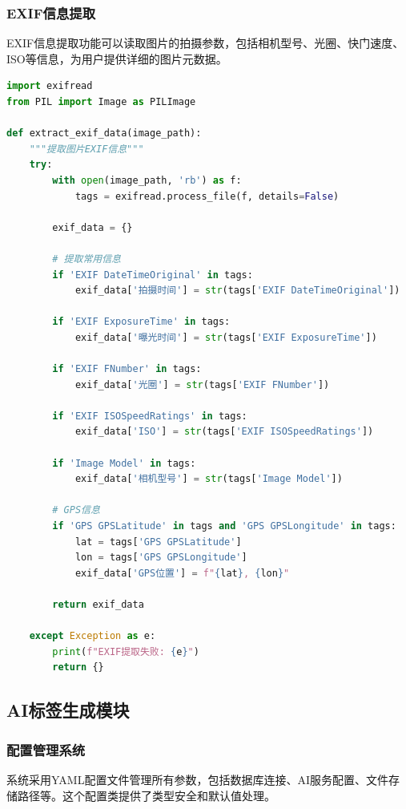 \documentclass[cs4size,a4paper]{ctexart}
\numberwithin{equation}{section}
\numberwithin{table}{section}
\numberwithin{figure}{section}
\begin{document}
\subsubsection{EXIF信息提取}

EXIF信息提取功能可以读取图片的拍摄参数，包括相机型号、光圈、快门速度、ISO等信息，为用户提供详细的图片元数据。

\begin{lstlisting}[language=Python,caption=图片EXIF元数据提取功能]
import exifread
from PIL import Image as PILImage

def extract_exif_data(image_path):
    """提取图片EXIF信息"""
    try:
        with open(image_path, 'rb') as f:
            tags = exifread.process_file(f, details=False)

        exif_data = {}

        # 提取常用信息
        if 'EXIF DateTimeOriginal' in tags:
            exif_data['拍摄时间'] = str(tags['EXIF DateTimeOriginal'])

        if 'EXIF ExposureTime' in tags:
            exif_data['曝光时间'] = str(tags['EXIF ExposureTime'])

        if 'EXIF FNumber' in tags:
            exif_data['光圈'] = str(tags['EXIF FNumber'])

        if 'EXIF ISOSpeedRatings' in tags:
            exif_data['ISO'] = str(tags['EXIF ISOSpeedRatings'])

        if 'Image Model' in tags:
            exif_data['相机型号'] = str(tags['Image Model'])

        # GPS信息
        if 'GPS GPSLatitude' in tags and 'GPS GPSLongitude' in tags:
            lat = tags['GPS GPSLatitude']
            lon = tags['GPS GPSLongitude']
            exif_data['GPS位置'] = f"{lat}, {lon}"

        return exif_data

    except Exception as e:
        print(f"EXIF提取失败: {e}")
        return {}
\end{lstlisting}

\subsection{AI标签生成模块}

\subsubsection{配置管理系统}

系统采用YAML配置文件管理所有参数，包括数据库连接、AI服务配置、文件存储路径等。这个配置类提供了类型安全和默认值处理。
\end{document}
